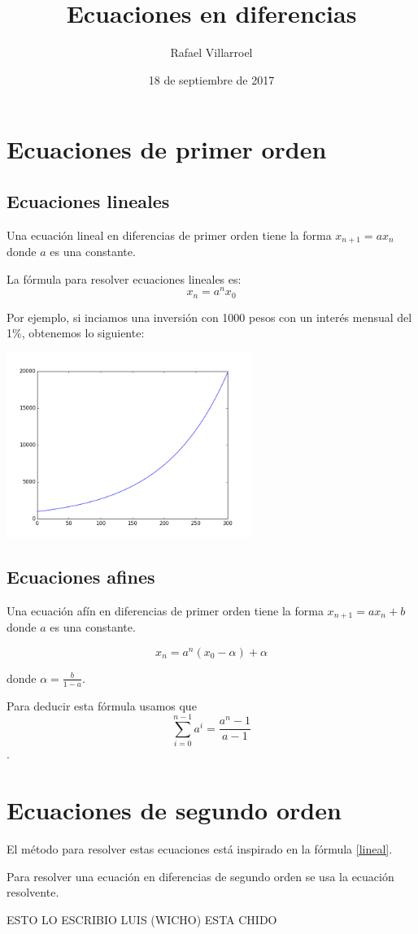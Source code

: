 \documentclass{article}
\title{Ecuaciones en diferencias}
\author{Rafael Villarroel}
\date{18 de septiembre de 2017}
\begin{document}
\maketitle

\section{Ecuaciones de primer orden}

\subsection{Ecuaciones lineales}

Una ecuación lineal en diferencias de primer orden tiene la forma $x_{n+1}=ax_n$ donde $a$ es una constante. 

La fórmula para resolver ecuaciones lineales es:
\begin{equation}
  \label{lineal}
  x_n=a^nx_0
\end{equation}

Por ejemplo, si inciamos una inversión con 1000 pesos con un interés mensual del 1\%, obtenemos lo siguiente:

\begin{center}
  \includegraphics[width=8cm]{inversion.png}
\end{center}

\subsection{Ecuaciones afines}

Una ecuación afín en diferencias de primer orden tiene la forma $x_{n+1}=ax_n+b$ donde $a$ es una constante. 

\begin{equation}
  \label{afin}
  x_n=a^n(x_0-\alpha)+\alpha
\end{equation}

donde $\alpha=\frac{b}{1-a}$. 

Para deducir esta fórmula usamos que $$\sum_{i=0}^{n-1}a^i=\frac{a^n-1}{a-1}$$.

\section{Ecuaciones de segundo orden}

El método para resolver estas ecuaciones está inspirado en la fórmula \ref{lineal}.

Para resolver una ecuación en diferencias de segundo orden se usa la ecuación resolvente.

ESTO LO ESCRIBIO LUIS (WICHO)
ESTA CHIDO
\end{document}
